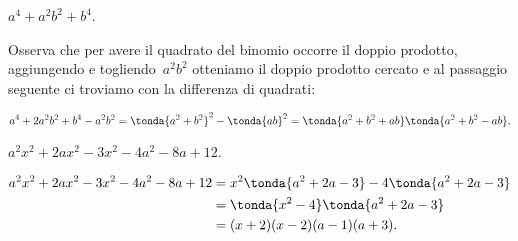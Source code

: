% 
% 
% 
% 
% 
% 
% 
% 

 \begin{esempio}
 \(a^4+a^{2}b^{2}+b^4\).

Osserva che per avere il quadrato del binomio occorre il doppio
prodotto, aggiungendo e togliendo~\(a^{2}b^{2}\) otteniamo il doppio
prodotto cercato e al passaggio seguente ci troviamo con la differenza
di quadrati:

\[a^4+2a^2b^2+b^4 -a^2b^2=\tonda{a^2+b^2}^2-\tonda{ab}^2%
 =\tonda{a^2+b^2+ab}\tonda{a^2+b^2-ab}.\]

 \end{esempio}
% 
% 

 \begin{esempio}
 \(a^{2}x^{2}+2ax^{2}-3x^{2}-4a^{2}-8a+12\).

 \begin{align*}
  a^{2}x^{2}+2ax^{2}-3x^{2}-4a^{2}-8a+12&=
  x^{2}\tonda{a^{2}+2a-3}-4\tonda{a^{2}+2a-3}\\
  &=\tonda{x^{2}-4}\tonda{a^{2}+2a-3}\\
  &=(x+2)(x-2)(a-1)(a+3).\\
 \end{align*}
 \end{esempio}

